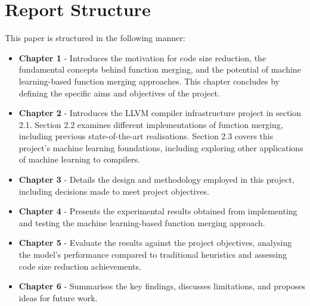 









\section{Report Structure}
This paper is structured in the following manner:
\begin{itemize}
    \item \textbf{Chapter 1} - Introduces the motivation for code size reduction, the fundamental concepts behind function merging, and the potential of machine learning-based function merging approaches. This chapter concludes by defining the specific aims and objectives of the project.
    \item \textbf{Chapter 2} - Introduces the LLVM compiler infrastructure project in section 2.1. Section 2.2 examines different implementations of function merging, including previous state-of-the-art realisations. Section 2.3 covers this project's machine learning foundations, including exploring other applications of machine learning to compilers.
    \item \textbf{Chapter 3} - Details the design and methodology employed in this project, including decisions made to meet project objectives.
    \item \textbf{Chapter 4} - Presents the experimental results obtained from implementing and testing the machine learning-based function merging approach.
    \item \textbf{Chapter 5} - Evaluate the results against the project objectives, analysing the model's performance compared to traditional heuristics and assessing code size reduction achievements.
    \item \textbf{Chapter 6} - Summarises the key findings, discusses limitations, and proposes ideas for future work.
\end{itemize}

